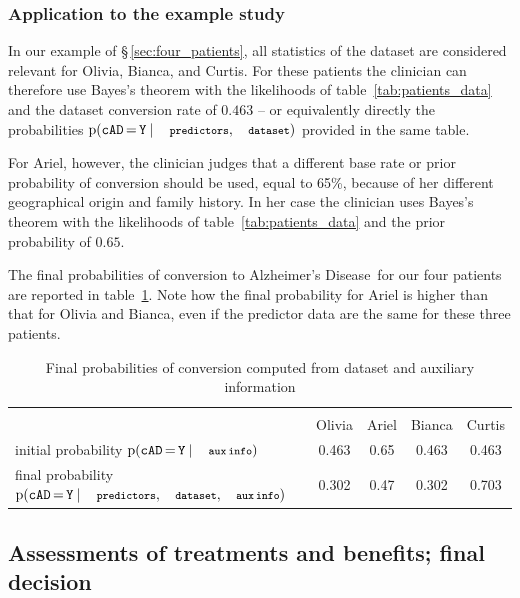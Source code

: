 \documentclass[utf8]{FrontiersinHarvard_mod} %
\newcommand*{\mo}[1][=]{\mathord{\,#1\,}}
\newcommand*{\sect}{\S}%
\newcommand*{\p}{\mathrm{p}}%
\renewcommand*{\|}[1][]{\nonscript\:#1\vert\nonscript\:\mathopen{}}
\newcommand*{\cad}{\texttt{cAD}}
\newcommand*{\yes}{\texttt{Y}}
\newcommand*{\predictors}{\texttt{\footnotesize predictors}}
\newcommand*{\dataset}{\texttt{\footnotesize dataset}}
\newcommand*{\auxinfo}{\texttt{\footnotesize aux\,info}}
\newcommand*{\ad}{Alzheimer's Disease}
\begin{document}
\subsubsection{Application to the example study}
\label{sec:posterior_application}

In our example of \sect\,\ref{sec:four_patients}, all statistics of the dataset are considered relevant for Olivia, Bianca, and Curtis. For these patients the clinician can therefore use Bayes's theorem with the likelihoods of table~\ref{tab:patients_data} and the dataset conversion rate of $0.463$ -- or equivalently directly the probabilities $\p(\cad\mo\yes \| \predictors, \dataset)$ provided in the same table.

For Ariel, however, the clinician judges that a different base rate or prior probability of conversion should be used, equal to 65\%, because of her different geographical origin and family history. In her case the clinician uses Bayes's theorem with the likelihoods of table~\ref{tab:patients_data} and the prior probability of $0.65$.

The final probabilities of conversion to \ad\ for our four patients are reported in table~\ref{tab:posterior_patients}. Note how the final probability for Ariel is higher than that for Olivia and Bianca, even if the predictor data are the same for these three patients.

\medskip
\begin{table}[!h]
  \centering
  \begin{tabular}{lcccc}
    \hline\\[-1.5\jot]
    &{\small Olivia} &{\small Ariel} &{\small Bianca} &{\small Curtis}
    \\[\jot]
    {\small initial probability\; $\p(\cad\mo\yes \| \auxinfo)$}&
    0.463&0.65&0.463&0.463
    \\[\jot]
    {\small final probability\; $\p(\cad\mo\yes \| \predictors, \dataset, \auxinfo)$}&
    0.302&0.47&0.302&0.703
    \\[\jot]
    \hline
  \end{tabular}
    \caption{Final probabilities of conversion computed from dataset and auxiliary information}\label{tab:posterior_patients}
\end{table}


\bigskip%
\subsection{Assessments of treatments and benefits; final decision}
\label{sec:utilities_step}
\end{document}
